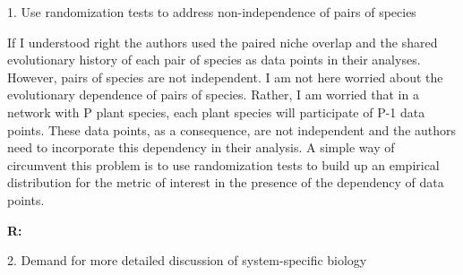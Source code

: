 \documentclass[12pt]{letter}
\newenvironment{refquote}{\bigskip \begin{it}}{\end{it}\smallskip}
\begin{document}
  1. Use randomization tests to address non-independence of pairs of species

    \begin{refquote}

      If I understood right the authors used the paired niche overlap and the shared evolutionary history of each pair of species as data points in their analyses. However, pairs of species are not independent. I am not here worried about the evolutionary dependence of pairs of species. Rather, I am worried that in a network with P plant species, each plant species will participate of P-1 data points. These data points, as a consequence, are not independent and the authors need to incorporate this dependency in their analysis. A simple way of circumvent this problem is to use randomization tests to build up an empirical distribution for the metric of interest in the presence of the dependency of data points.

      \end{refquote}

      \textbf{R:} 


  2. Demand for more detailed discussion of system-specific biology
\end{document}
